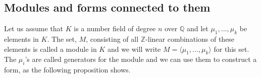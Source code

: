\documentclass{article}
\newcommand{\mbb}[1]{\mathbb{#1}}
\numberwithin{equation}{section}
\begin{document}

\subsection{Modules and forms connected to them}
Let us assume that $K$ is a number field of degree $n$ over $\mbb Q$ and let $\mu_1, ..., \mu_k$ be elements in $K$. The set, $M$, consisting of all $\mbb{Z}$-linear combinations of these elements is called a module in $K$ and we will write $M = \langle \mu_1, ..., \mu_k \rangle$ for this set. The $\mu_i$'s are called generators for the module and we can use them to construct a form, as the following proposition shows.
\end{document}
